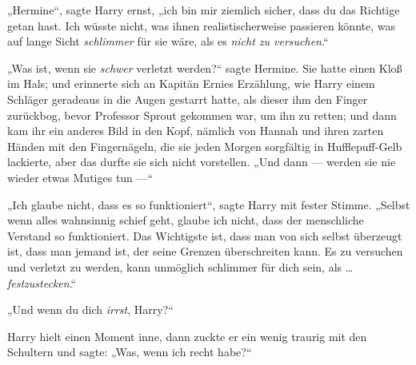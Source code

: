 „Hermine“, sagte Harry ernst, „ich bin mir ziemlich sicher, dass du das Richtige getan hast. Ich wüsste nicht, was ihnen realistischerweise passieren könnte, was auf lange Sicht \emph{schlimmer} für sie wäre, als es \emph{nicht zu versuchen}.“

„Was ist, wenn sie \emph{schwer} verletzt werden?“ sagte Hermine. Sie hatte einen Kloß im Hals; und erinnerte sich an Kapitän Ernies Erzählung, wie Harry einem Schläger geradeaus in die Augen gestarrt hatte, als dieser ihm den Finger zurückbog, bevor Professor Sprout gekommen war, um ihn zu retten; und dann kam ihr ein anderes Bild in den Kopf, nämlich von Hannah und ihren zarten Händen mit den Fingernägeln, die sie jeden Morgen sorgfältig in Hufflepuff-Gelb lackierte, aber das durfte sie sich nicht vorstellen.
„Und dann — werden sie nie wieder etwas Mutiges tun —“

„Ich glaube nicht, dass es so funktioniert“, sagte Harry mit fester Stimme.
„Selbst wenn alles wahnsinnig schief geht, glaube ich nicht, dass der menschliche Verstand so funktioniert. Das Wichtigste ist, dass man von sich selbst überzeugt ist, dass man jemand ist, der seine Grenzen überschreiten kann. Es zu versuchen und verletzt zu werden, kann unmöglich schlimmer für dich sein, als … \emph{festzustecken}.“

„Und wenn du dich \emph{irrst}, Harry?“

Harry hielt einen Moment inne, dann zuckte er ein wenig traurig mit den Schultern und sagte:
„Was, wenn ich recht habe?“

